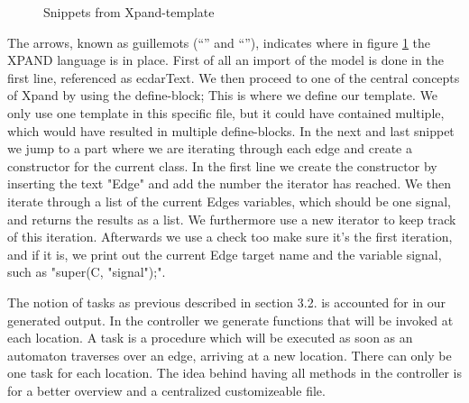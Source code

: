 \begin{figure}[t]
%
%
%
\caption{Snippets from Xpand-template \label{xpand-example}}
\end{figure}

The arrows, known as guillemots (``\guillemotleft'' and ``\guillemotright''),
indicates where in figure \ref{xpand-example} the XPAND language is in place. First
of all an import of the model is done in the first line, referenced as
ecdarText. We then proceed to one of the central concepts of Xpand by using the
define-block; This is where we define our template. We only use one template in
this specific file, but it could have contained multiple, which would have
resulted in multiple define-blocks. In the next and last snippet we jump to a
part where we are iterating through each edge and create a constructor for the
current class. In the first line we create the constructor by inserting the text
"Edge" and add the number the iterator has reached. We then iterate through a
list of the current Edges variables, which should be one signal, and returns the
results as a list. We furthermore use a new iterator to keep track of this
iteration. Afterwards we use a check too make sure it's the first iteration, and if it is, we
print out the current Edge target name and the variable signal, such as "super(C,
"signal");".

The notion of tasks as previous described in section 3.2. is accounted for in
our generated output. In the controller we generate functions that will be
invoked at each location. A task is a procedure which will be executed as soon
as an automaton traverses over an edge, arriving at a new location. There can
only be one task for each location. The idea behind having all methods in the
controller is for a better overview and a centralized customizeable file.
